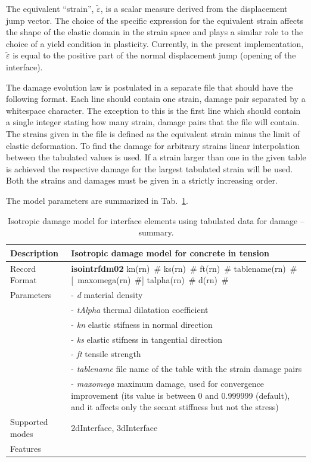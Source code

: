 \documentclass[a4paper]{article}
\newcommand{\descitem}[1]{{\noindent \bf #1}}
\newcommand{\elemparam}[2]{{{#1\tiny (#2)}~\#}}
\newcommand{\optelemparam}[2]{[{~\elemparam{#1}{#2}}]}
\newcommand{\param}[1]{{\it #1}}
\newenvironment{mmt}{\begin{tabular}{|l|p{9cm}|}}{\end{tabular}\\}
\newenvironment{mmt}{\begin{tabular}{|l|l|}}{\end{tabular}\\}
\begin{document}
The equivalent ``strain'', $\tilde\varepsilon$, is a scalar measure derived from the displacement jump vector. The choice of the specific expression
for the equivalent strain affects the shape of the elastic domain
in the strain space and plays a similar role to the choice of a yield
condition in plasticity.
Currently, in the present implementation,  $\tilde\varepsilon$ is equal to the positive part of the normal displacement jump (opening of the interface).

The damage evolution law is postulated in a separate file that should have the following format. Each line should contain one strain, damage pair separated by a whitespace character. The exception to this is the first line which should contain a single integer stating how many strain, damage pairs that the file will contain. The strains given in the file is defined as the equivalent strain minus the limit of elastic deformation.
To find the damage for arbitrary strains linear interpolation between the tabulated values is used. If a strain larger than one in the given table is achieved the respective damage for the largest tabulated strain will be used. Both the strains and damages must be given in a strictly increasing order.

The model parameters are summarized in Tab.~\ref{iidTabulated_table}. 
\begin{table}[!htb]
  \small
\begin{mmt}
\hline
Description & Isotropic damage model for concrete in tension\\
\hline
Record Format & \descitem{isointrfdm02} 
\elemparam{kn}{rn} \elemparam{ks}{rn} \elemparam{ft}{rn} \elemparam{tablename}{rn} \optelemparam{maxomega}{rn} \elemparam{talpha}{rn} \elemparam{d}{rn}\\
Parameters & - \param{d} material density\\
&- \param{tAlpha} thermal dilatation coefficient\\
&- \param{kn} elastic stifness in normal direction\\
&- \param{ks} elastic stifness in tangential direction\\
&- \param{ft} tensile strength\\
&- \param{tablename} file name of the table with the strain damage pairs\\
&- \param{maxomega} maximum damage, used for convergence improvement
(its value is between 0 and 0.999999 (default), 
and it affects only the secant stiffness but not the stress)\\
Supported modes& 2dInterface, 3dInterface\\
Features & \\
\hline
\end{mmt}
\caption{Isotropic damage model for interface elements using tabulated data for damage -- summary.}
\label{iidTabulated_table}
\end{table}
\end{document}

